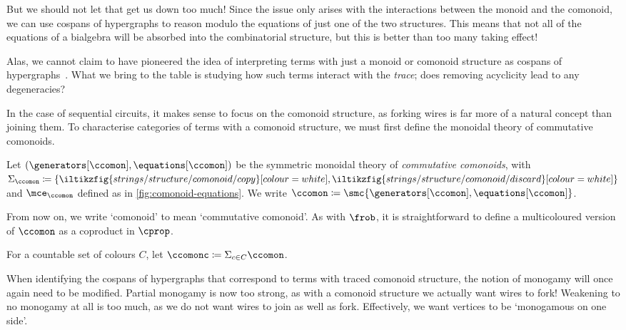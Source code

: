 But we should not let that get us down too much!
Since the issue only arises with the interactions between the monoid and the
comonoid, we can use cospans of hypergraphs to reason modulo the equations of
just one of the two structures.
This means that not all of the equations of a bialgebra will be absorbed into
the combinatorial structure, but this is better than too many taking effect!

\begin{remark}
    Alas, we cannot claim to have pioneered the idea of interpreting terms with
    just a monoid or comonoid structure as cospans of
    hypergraphs~\cite{fritz2023free,milosavljevic2023string}.
    What we bring to the table is studying how such terms interact with the
    \emph{trace}; does removing acyclicity lead to any degeneracies?
\end{remark}

In the case of sequential circuits, it makes sense to focus on the comonoid
structure, as forking wires is far more of a natural concept than joining them.
To characterise categories of terms with a comonoid structure, we must first
define the monoidal theory of commutative comonoids.

\begin{definition}
    Let \((\generators[\ccomon], \equations[\ccomon])\) be the symmetric
    monoidal theory of \emph{commutative comonoids}, with \(
        \Sigma_{\ccomon} \coloneqq \{
            \iltikzfig{strings/structure/comonoid/copy}[colour=white],
            \iltikzfig{strings/structure/comonoid/discard}[colour=white]
        \}
    \) and \(\mce_{\ccomon}\) defined as in \cref{fig:comonoid-equations}.
    We write \(
        \ccomon \coloneqq \smc{\generators[\ccomon], \equations[\ccomon]}
    \).
\end{definition}



From now on, we write `comonoid' to mean `commutative comonoid'.
As with \(\frob\), it is straightforward to define a multicoloured version of
\(\ccomon\) as a coproduct in \(\cprop\).

\begin{definition}
    For a countable set of colours \(C\), let
    \(\ccomonc \coloneqq \Sigma_{c \in C} \ccomon\).
\end{definition}

When identifying the cospans of hypergraphs that correspond to terms with traced
comonoid structure, the notion of monogamy will once again need to be modified.
Partial monogamy is now too strong, as with a comonoid structure we actually
want wires to fork!
Weakening to no monogamy at all is too much, as we do not want wires to join as
well as fork.
Effectively, we want vertices to be `monogamous on one side'.

